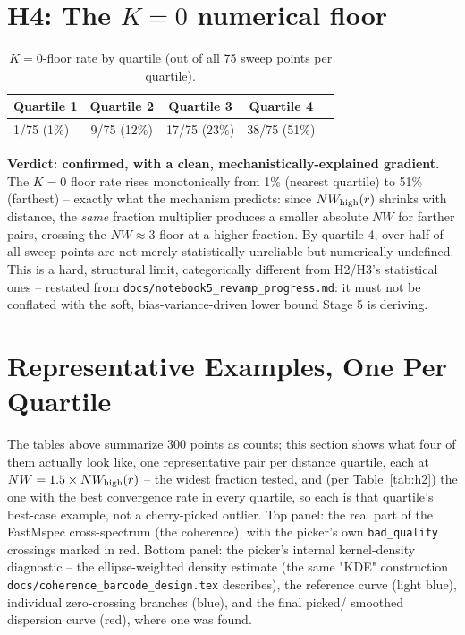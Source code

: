 \documentclass[11pt]{article}
\begin{document}
\section{H4: The $K=0$ numerical floor}
\label{sec:h4}

\begin{table}[h]
\centering
\begin{tabular}{lcccc}
\toprule
Quartile 1 & Quartile 2 & Quartile 3 & Quartile 4 \\
\midrule
1/75 (1\%) & 9/75 (12\%) & 17/75 (23\%) & 38/75 (51\%) \\
\bottomrule
\end{tabular}
\caption{$K=0$-floor rate by quartile (out of all 75 sweep points per quartile).}
\label{tab:h4}
\end{table}

\textbf{Verdict: confirmed, with a clean, mechanistically-explained gradient.} The $K=0$ floor
rate rises monotonically from 1\% (nearest quartile) to 51\% (farthest) -- exactly what the
mechanism predicts: since $NW_{\rm high}(r)$ shrinks with distance, the \emph{same} fraction
multiplier produces a smaller absolute $NW$ for farther pairs, crossing the $NW\approx 3$ floor at
a higher fraction. By quartile 4, over half of all sweep points are not merely statistically
unreliable but numerically undefined. This is a hard, structural limit, categorically different
from H2/H3's statistical ones -- restated from \texttt{docs/notebook5\_revamp\_progress.md}: it
must not be conflated with the soft, bias-variance-driven lower bound Stage 5 is deriving.

\section{Representative Examples, One Per Quartile}
\label{sec:examples}

The tables above summarize 300 points as counts; this section shows what four of them actually
look like, one representative pair per distance quartile, each at $NW=1.5\times NW_{\rm high}(r)$
-- the widest fraction tested, and (per Table~\ref{tab:h2}) the one with the best convergence rate
in every quartile, so each is that quartile's best-case example, not a cherry-picked outlier. Top
panel: the real part of the FastMspec cross-spectrum
(the coherence), with the picker's own \texttt{bad\_quality} crossings marked in red. Bottom
panel: the picker's internal kernel-density diagnostic -- the ellipse-weighted density estimate
(the same "KDE" construction \texttt{docs/coherence\_barcode\_design.tex} describes), the
reference curve (light blue), individual zero-crossing branches (blue), and the final picked/
smoothed dispersion curve (red), where one was found.
\end{document}
